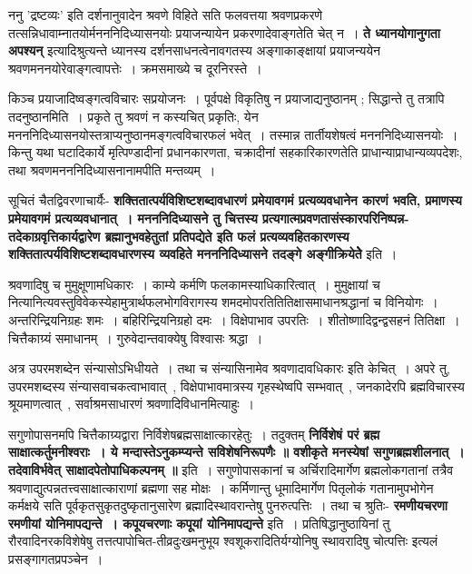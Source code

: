 	ननु 'द्रष्टव्यः' इति दर्शनानुवादेन श्रवणे विहिते सति फलवत्तया श्रवणप्रकरणे तत्सन्निधावाम्नातयोर्मनननिदिध्यासनयोः प्रयाजन्यायेन प्रकरणादेवाङ्गतेति चेत् न~। {\bfseries ते ध्यानयोगानुगता अपश्यन्} इत्यादिश्रुत्यन्ते ध्यानस्य दर्शनसाधनत्वेनावगतस्य अङ्गाकाङ्क्षायां प्रयाजन्ययेन श्रवणमननयोरेवाङ्गत्वापत्तेः~। क्रमसमाख्ये च दूरनिरस्ते~।\par
	किञ्च प्रयाजादिष्वङ्गत्वविचारः सप्रयोजनः~। पूर्वपक्षे विकृतिषु न प्रयाजाद्यनुष्ठानम् ; सिद्धान्ते तु तत्रापि तदनुष्ठानमिति~। प्रकृते तु श्रवणं न कस्यचित् प्रकृतिः, येन मनननिदिध्यासनयोस्तत्राप्यनुष्ठानमङ्गत्वविचारफलं भवेत्~। तस्मान्न तार्तीयशेषत्वं मनननिदिध्यासनयोः~। किन्तु यथा घटादिकार्ये मृत्पिण्डादीनां प्रधानकारणता, चक्रादीनां सहकारिकारणतेति प्राधान्याप्राधान्यव्यपदेशः, तथा श्रवणमनननिदिध्यासनानामपीति मन्तव्यम्~।\par
	सूचितं चैतद्विवरणाचार्यैः- {\bfseries शक्तितात्पर्यविशिष्टशब्दावधारणं प्रमेयावगमं प्रत्यव्यवधानेन कारणं भवति, प्रमाणस्य प्रमेयावगमं प्रत्यव्यवधानात्~। मनननिदिध्यासने तु चित्तस्य प्रत्यगात्मप्रवणतासंस्कारपरिनिष्पन्न-तदेकाग्रवृत्तिकार्यद्वारेण ब्रह्मानुभवहेतुतां प्रतिपद्येते इति फलं प्रत्यव्यवहितकारणस्य शक्तितात्पर्यविशिष्टशब्दावधारणस्य व्यवहिते मनननिदिध्यासने तदङ्गे अङ्गीक्रियेतेेेे} इति~।\par
	श्रवणादिषु च मुमुक्षूणामधिकारः~। काम्ये कर्मणि फलकामस्याधिकारित्वात्~। मुमुक्षायां च नित्यानित्यवस्तुविवेकस्येहामुत्रार्थफलभोगविरागस्य शमदमोपरतितितिक्षासमाधानश्रद्धानां च विनियोगः~। अन्तरिन्द्रियनिग्रहः शमः~। बहिरिन्द्रियनिग्रहो दमः~। विक्षेपाभाव उपरतिः~। शीतोष्णादिद्वन्द्वसहनं तितिक्षा~। चित्तैकाग्र्यं समाधानम्~। गुरुवेदान्तवाक्येषु विश्वासः श्रद्धा~।\par
	अत्र उपरमशब्देन संन्यासोऽभिधीयते~। तथा च संन्यासिनामेव श्रवणादावधिकारः इति केचित्~। अपरे तु, उपरमशब्दस्य संन्यासवाचकत्वाभावात्~, विक्षेपाभावमात्रस्य गृहस्थेष्वपि सम्भवात्~, जनकादेरपि ब्रह्मविचारस्य श्रूयमाणत्वात्~, सर्वाश्रमसाधारणं श्रवणादिविधानमित्याहुः~।\par
	सगुणोपासनमपि चित्तैकाग्र्यद्वारा निर्विशेषब्रह्मसाक्षात्कारहेतुः~। तदुक्तम् {\bfseries निर्विशेषं परं ब्रह्म साक्षात्कर्तुमनीश्वराः~। ये मन्दास्तेऽनुकम्प्यन्ते सविशेषनिरूपणैः ॥ वशीकृते मनस्येषां सगुणब्रह्मशीलनात्~। तदेवाविर्भवेत् साक्षादपेतोपाधिकल्पनम् ॥} इति~। सगुणोपासकानां च अर्चिरादिमार्गेण ब्रह्मलोकगतानां तत्रैव श्रवणाद्युत्पन्नतत्त्वसाक्षात्काराणां ब्रह्मणा सह मोक्षः~। कर्मिणान्तु धूमादिमार्गेण पितृलोकं गतानामुपभोगेन कर्मक्षये सति पूर्वकृतसुकृतदुष्कृतानुसारेण ब्रह्मादिस्थावरान्तेषु पुनरुत्पत्तिः~। तथा च श्रुतिः- {\bfseries रमणीयचरणा रमणीयां योनिमापद्यन्ते~। कपूयचरणाः कपूयां योनिमापद्यन्ते} इति~। प्रतिषिद्धानुष्ठायिनां तु रौरवादिनरकविशेषेषु तत्तत्पापोचित-तीव्रदुःखमनुभूय श्वशूकरादितिर्यग्योनिषु स्थावरादिषु चोत्पत्तिः इत्यलं प्रसङ्गागतप्रपञ्चेन~।\par
